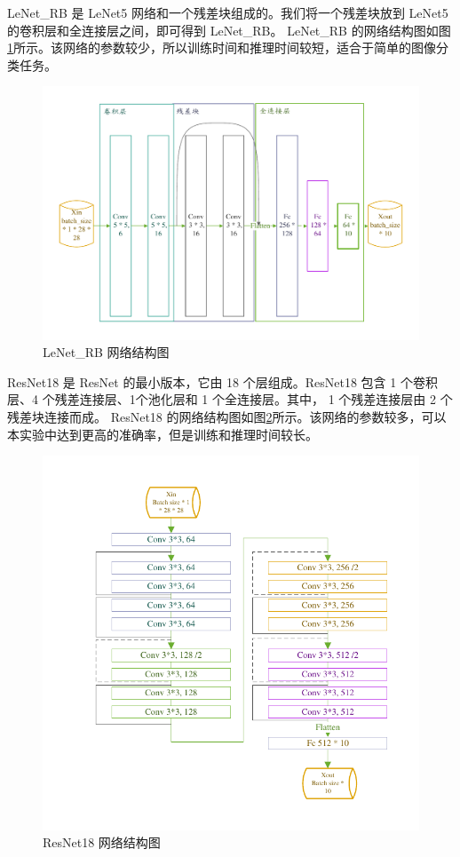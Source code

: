 \documentclass[supercite]{Experimental_Report}
\theoremstyle{definition}
\begin{document}
LeNet\_RB 是 LeNet5 网络和一个残差块组成的。我们将一个残差块放到 LeNet5 的卷积层和全连接层之间，即可得到 LeNet\_RB。
LeNet\_RB 的网络结构图如图\ref{LeNetRB网络结构图}所示。该网络的参数较少，所以训练时间和推理时间较短，适合于简单的图像分类任务。
\begin{figure}[H]
	\begin{center}
		\includegraphics[scale=0.45]{../images/LeNetRB网络结构图.pdf}
		\caption{LeNet\_RB 网络结构图}
		\label{LeNetRB网络结构图}
	\end{center}
\end{figure}

ResNet18 是 ResNet 的最小版本，它由 18 个层组成。ResNet18 包含 1 个卷积层、4 个残差连接层、1个池化层和 1 个全连接层。其中， 1 个残差连接层由 2 个残差块连接而成。
ResNet18 的网络结构图如图\ref{ResNet18网络结构图}所示。该网络的参数较多，可以本实验中达到更高的准确率，但是训练和推理时间较长。
\begin{figure}[H]
	\begin{center}
		\includegraphics[scale=0.9]{../images/ResNet18网络结构图.pdf}
		\caption{ResNet18 网络结构图}
		\label{ResNet18网络结构图}
	\end{center}
\end{figure}
\end{document}
